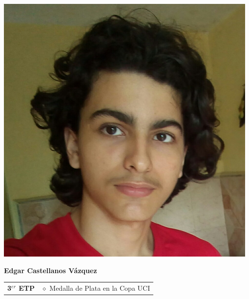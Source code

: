 \pagebreak

\begin{minipage}{0.2\textwidth}
	\includegraphics[width=\linewidth]{img/concursantes/edgar.png} %
\end{minipage}
\hfill
\begin{minipage}{0.7\textwidth}
	\textbf{Edgar Castellanos Vázquez}
	
	\vspace*{0.1in}
	\begin{tabular}{rl}
		\textbf{3$^{er}$ ETP} & $\diamond$ Medalla de Plata en la Copa UCI  \\
	\end{tabular}
\end{minipage}

\vspace*{0.2in}

